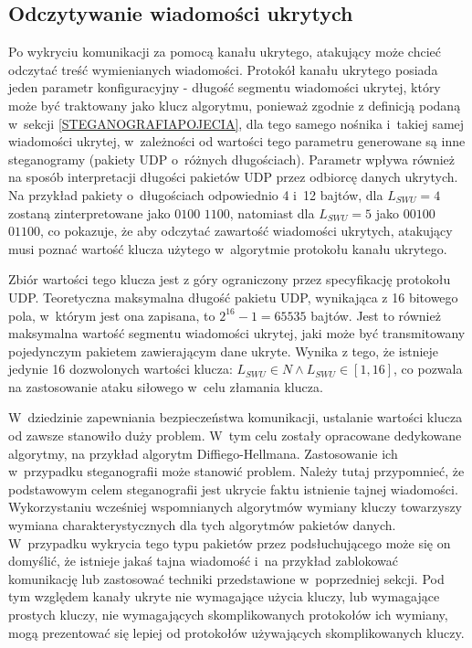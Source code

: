 \documentclass[a4paper, twoside, 12pt]{report}
\begin{document}
       \subsection{Odczytywanie wiadomości ukrytych}
       Po wykryciu komunikacji za pomocą kanału ukrytego, atakujący może chcieć
       odczytać treść wymienianych wiadomości. Protokół kanału ukrytego posiada
       jeden parametr konfiguracyjny - długość segmentu wiadomości ukrytej, który
       może być traktowany jako klucz algorytmu, ponieważ zgodnie z definicją podaną
       w~sekcji \ref{STEGANOGRAFIAPOJECIA}, dla tego samego nośnika i~takiej samej
       wiadomości ukrytej, w~zależności od wartości tego parametru generowane są
       inne steganogramy (pakiety UDP o~różnych długościach). Parametr wpływa również
       na sposób interpretacji długości pakietów UDP przez odbiorcę danych ukrytych.
       Na przykład pakiety o~długościach odpowiednio 4 i~12 bajtów, dla \( L_{SWU} = 4 \)
       zostaną zinterpretowane jako \( 0100 \) \( 1100 \), natomiast dla \( L_{SWU} = 5 \)
       jako \( 00100 \) \( 01100 \), co pokazuje, że aby odczytać zawartość wiadomości
       ukrytych, atakujący musi poznać wartość klucza użytego w~algorytmie protokołu
       kanału ukrytego.

       Zbiór wartości tego
       klucza jest z góry ograniczony przez specyfikację protokołu UDP. Teoretyczna
       maksymalna długość pakietu UDP, wynikająca z 16 bitowego pola, w~którym jest
       ona zapisana, to \(2^{16} - 1 = 65535\) bajtów. Jest to również maksymalna
       wartość segmentu wiadomości ukrytej, jaki może być transmitowany pojedynczym
       pakietem zawierającym dane ukryte. Wynika z tego, że istnieje jedynie 16
       dozwolonych wartości klucza: \( L_{SWU} \in N \land L_{SWU} \in [1, 16] \),
       co pozwala na zastosowanie ataku siłowego w~celu złamania klucza.

       W~dziedzinie zapewniania bezpieczeństwa komunikacji, ustalanie wartości
       klucza od zawsze stanowiło duży problem. W~tym celu zostały opracowane
       dedykowane algorytmy, na przykład algorytm Diffiego-Hellmana. Zastosowanie
       ich w~przypadku steganografii może stanowić problem. Należy tutaj przypomnieć,
       że podstawowym celem steganografii jest ukrycie faktu istnienie tajnej wiadomości.
       Wykorzystaniu wcześniej wspomnianych algorytmów wymiany kluczy towarzyszy
       wymiana charakterystycznych dla tych algorytmów pakietów danych. W~przypadku
       wykrycia tego typu pakietów przez podsłuchującego może się on domyślić,
       że istnieje jakaś tajna wiadomość i~na przykład zablokować komunikację lub
       zastosować techniki przedstawione w~poprzedniej sekcji. Pod tym względem
       kanały ukryte nie wymagające użycia kluczy, lub wymagające prostych kluczy,
       nie wymagających skomplikowanych protokołów ich wymiany, mogą prezentować
       się lepiej od protokołów używających skomplikowanych kluczy.
\end{document}
